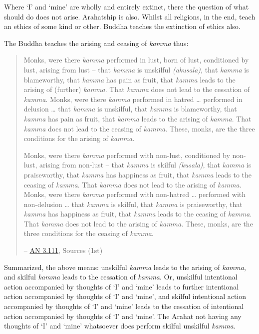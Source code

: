 Where `I' and `mine' are wholly and entirely extinct, there the question of what should  do does not arise. Arahatship is  also. Whilst all religions, in the end, teach an ethics of some kind or other. Buddha teaches the extinction of  ethics also.

The Buddha teaches the arising and ceasing of \emph{kamma} thus:

\begin{quote}
Monks, were there \emph{kamma} performed in lust, born of lust, conditioned by lust, arising from lust -- that \emph{kamma} is unskilful \emph{(akusala)}, that \emph{kamma} is blameworthy, that \emph{kamma} has pain as fruit, that \emph{kamma} leads to the arising of (further) \emph{kamma}. That \emph{kamma} does not lead to the cessation of \emph{kamma}. Monks, were there \emph{kamma} performed in hatred \ldots{} performed in delusion \ldots{} that \emph{kamma} is unskilful, that \emph{kamma} is blameworthy, that \emph{kamma} has pain as fruit, that \emph{kamma} leads to the arising of \emph{kamma}. That \emph{kamma} does not lead to the ceasing of \emph{kamma}. These, monks, are the three conditions for the arising of \emph{kamma}.

Monks, were there \emph{kamma} performed with non-lust, conditioned by non-lust, arising from non-lust -- that \emph{kamma} is skilful \emph{(kusala)}, that \emph{kamma} is praiseworthy, that \emph{kamma} has happiness as fruit, that \emph{kamma} leads to the ceasing of \emph{kamma}. That \emph{kamma} does not lead to the arising of \emph{kamma}. Monks, were there \emph{kamma} performed with non-hatred \ldots{} performed with non-delusion \ldots{} that \emph{kamma} is skilful, that \emph{kamma} is praiseworthy, that \emph{kamma} has happiness as fruit, that \emph{kamma} leads to the ceasing of \emph{kamma}. That \emph{kamma} does not lead to the arising of \emph{kamma}. These, monks, are the three conditions for the ceasing of \emph{kamma}.

 -- \href{https://suttacentral.net/an3.111/en/sujato}{AN 3.111}, Sources (1st)
\end{quote}

Summarized, the above means: unskilful \emph{kamma} leads to the arising of \emph{kamma}, and skilful \emph{kamma} leads to the cessation of \emph{kamma}. Or, unskilful intentional action accompanied by thoughts of `I' and `mine' leads to further intentional action accompanied by thoughts of `I' and `mine', and skilful intentional action accompanied by thoughts of `I' and `mine' leads to the cessation of intentional action accompanied by thoughts of `I' and `mine'. The Arahat not having any thoughts of `I' and `mine' whatsoever does  perform  skilful  unskilful \emph{kamma}.

